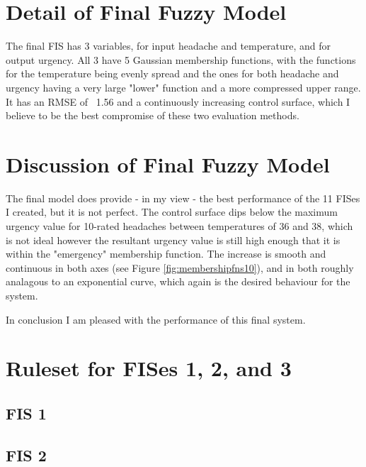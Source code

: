 \documentclass[12pt, a4paper]{report}
\begin{document}
\section{Detail of Final Fuzzy Model}

The final FIS has 3 variables, for input headache and temperature, and for output urgency.
All 3 have 5 Gaussian membership functions, with the functions for the temperature being evenly spread and the ones for both headache and urgency having a very large "lower" function and a more compressed upper range.
It has an RMSE of ~1.56 and a continuously increasing control surface, which I believe to be the best compromise of these two evaluation methods.

\section{Discussion of Final Fuzzy Model}

The final model does provide - in my view - the best performance of the 11 FISes I created, but it is not perfect.
The control surface dips below the maximum urgency value for 10-rated headaches between temperatures of 36 and 38, which is not ideal however the resultant urgency value is still high enough that it is within the "emergency" membership function.
The increase is smooth and continuous in both axes (see Figure \ref{fig:membershipfns10}), and in both roughly analagous to an exponential curve, which again is the desired behaviour for the system.

\par

In conclusion I am pleased with the performance of this final system.

\appendix

\section{Ruleset for FISes 1, 2, and 3}

\subsection{FIS 1}


\subsection{FIS 2}

\end{document}
